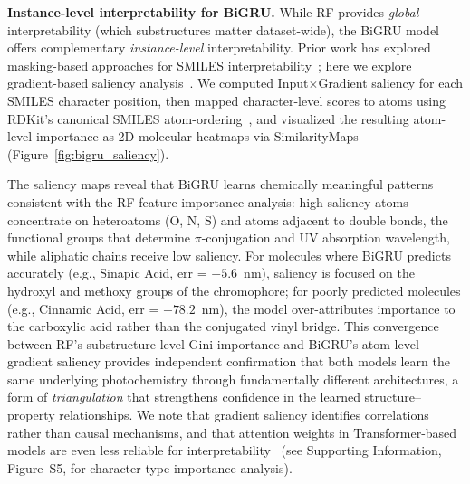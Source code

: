 \documentclass[journal=jcisd8,manuscript=article]{achemso}
\begin{document}
\textbf{Instance-level interpretability for BiGRU.}
While RF provides \emph{global} interpretability (which substructures matter dataset-wide), the BiGRU model offers complementary \emph{instance-level} interpretability.
Prior work has explored masking-based approaches for SMILES interpretability~\cite{gohSMILES2VecInterpretableGeneralPurpose2018}; here we explore gradient-based saliency analysis~\cite{simonyan2014deep}.
We computed Input$\times$Gradient saliency for each SMILES character position, then mapped character-level scores to atoms using RDKit's canonical SMILES atom-ordering~\cite{landrumRdkitRdkit2020_03_12020}, and visualized the resulting atom-level importance as 2D molecular heatmaps via SimilarityMaps~\cite{riniker2013similarity} (Figure~\ref{fig:bigru_saliency}).

The saliency maps reveal that BiGRU learns chemically meaningful patterns consistent with the RF feature importance analysis: high-saliency atoms concentrate on heteroatoms (O, N, S) and atoms adjacent to double bonds, the functional groups that determine $\pi$-conjugation and UV absorption wavelength, while aliphatic chains receive low saliency.
For molecules where BiGRU predicts accurately (e.g., Sinapic Acid, err = $-5.6$~nm), saliency is focused on the hydroxyl and methoxy groups of the chromophore; for poorly predicted molecules (e.g., Cinnamic Acid, err = $+78.2$~nm), the model over-attributes importance to the carboxylic acid rather than the conjugated vinyl bridge.
This convergence between RF's substructure-level Gini importance and BiGRU's atom-level gradient saliency provides independent confirmation that both models learn the same underlying photochemistry through fundamentally different architectures, a form of \emph{triangulation} that strengthens confidence in the learned structure--property relationships.
We note that gradient saliency identifies correlations rather than causal mechanisms, and that attention weights in Transformer-based models are even less reliable for interpretability~\cite{jain2019attention} (see Supporting Information, Figure~S5, for character-type importance analysis).
\end{document}
